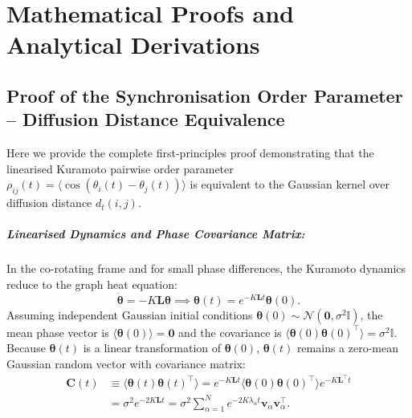 \chapter{Mathematical Proofs and Analytical Derivations}
\label{chap:appendix}

\section{Proof of the Synchronisation Order Parameter -- Diffusion Distance Equivalence}
\label{app:proof_eq2}

Here we provide the complete first-principles proof demonstrating that the linearised Kuramoto pairwise order parameter $\rho_{ij}(t) = \langle \cos(\theta_i(t) - \theta_j(t)) \rangle$ is equivalent to the Gaussian kernel over diffusion distance $d_t(i,j)$.

\paragraph{Linearised Dynamics and Phase Covariance Matrix:}
In the co-rotating frame and for small phase differences, the Kuramoto dynamics reduce to the graph heat equation:
\begin{equation}
\dot{\bm\theta} = -K \mathbf{L} \bm\theta \implies \bm\theta(t) = e^{-K \mathbf{L} t} \bm\theta(0).
\label{eq:heat_app}
\end{equation}
Assuming independent Gaussian initial conditions $\bm\theta(0) \sim \mathcal{N}(\mathbf{0}, \sigma^2 \mathbb{I})$, the mean phase vector is $\langle \bm\theta(0) \rangle = \mathbf{0}$ and the covariance is $\langle \bm\theta(0) \bm\theta(0)^\top \rangle = \sigma^2 \mathbb{I}$. Because $\bm\theta(t)$ is a linear transformation of $\bm\theta(0)$, $\bm\theta(t)$ remains a zero-mean Gaussian random vector with covariance matrix:
\begin{align}
\mathbf{C}(t) &\equiv \langle \bm\theta(t) \bm\theta(t)^\top \rangle 
= e^{-K\mathbf{L}t} \langle \bm\theta(0) \bm\theta(0)^\top \rangle e^{-K\mathbf{L}^\top t} \nonumber\\
&= \sigma^2 e^{-2K\mathbf{L}t} 
= \sigma^2 \sum_{\alpha=1}^N e^{-2K\lambda_\alpha t} \mathbf{v}_\alpha \mathbf{v}_\alpha^\top.
\end{align}

